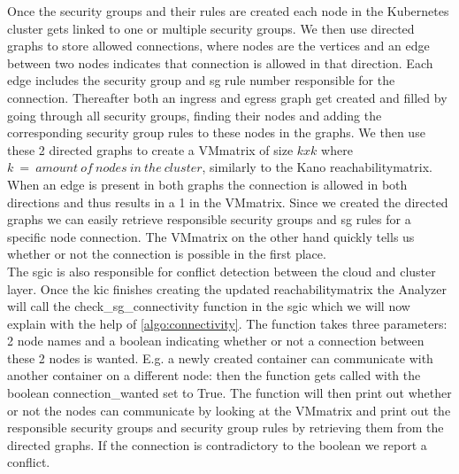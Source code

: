 Once the security groups and their rules are created each node in the Kubernetes cluster gets linked to one or multiple security groups. We then use directed graphs to store allowed connections, where nodes are the vertices and an edge between two nodes indicates that connection is allowed in that direction. Each edge includes the security group and \acrshort{sg} rule number responsible for the connection. Thereafter both an ingress and egress graph get created and filled by going through all security groups, finding their nodes and adding the corresponding security group rules to these nodes in the graphs. We then use these 2 directed graphs to create a VMmatrix of size \(kxk\) where \(k\ =\ amount\  of\  nodes\  in\  the\  cluster\), similarly to the Kano reachabilitymatrix. When an edge is present in both graphs the connection is allowed in both directions and thus results in a 1 in the VMmatrix. Since we created the directed graphs we can easily retrieve responsible security groups and \acrshort{sg} rules for a specific node connection. The VMmatrix on the other hand quickly tells us whether or not the connection is possible in the first place.
\\[10pt]

The \acrlong{sgic} is also responsible for conflict detection between the cloud and cluster layer. Once the \acrshort{kic} finishes creating the updated reachabilitymatrix the Analyzer will call the check\_sg\_connectivity function in the \acrshort{sgic} which we will now explain with the help of \autoref{algo:connectivity}. The function takes three parameters: 2 node names and a boolean indicating whether or not a connection between these 2 nodes is wanted. E.g. a newly created container can communicate with another container on a different node: then the function gets called with the boolean connection\_wanted set to True. The function will then print out whether or not the nodes can communicate by looking at the VMmatrix and print out the responsible security groups and security group rules by retrieving them from the directed graphs. If the connection is contradictory to the boolean we report a conflict.





\cleardoublepage


